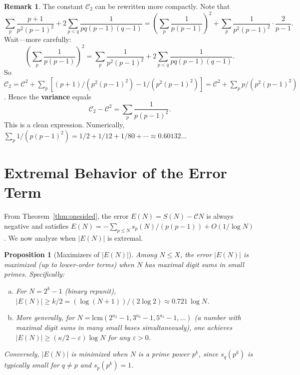 \documentclass[11pt,a4paper]{amsart}
\theoremstyle{plain}
\newtheorem{proposition}[theorem]{Proposition}
\theoremstyle{definition}
\newtheorem{remark}[theorem]{Remark}
\begin{document}
\begin{remark}
The constant $\mathcal{C}_2$ can be rewritten more compactly.  Note that
\[
\sum_p \frac{p+1}{p^2(p-1)^2} + 2\sum_{p < q} \frac{1}{pq(p-1)(q-1)}
= \left(\sum_p \frac{1}{p(p-1)}\right)^2 + \sum_p \frac{1}{p^2(p-1)^2}\cdot\frac{2}{p-1}.
\]
Wait---more carefully:
\[
\left(\sum_p \frac{1}{p(p-1)}\right)^2 = \sum_p \frac{1}{p^2(p-1)^2} + 2\sum_{p<q}\frac{1}{pq(p-1)(q-1)}.
\]
So $\mathcal{C}_2 = \mathcal{C}^2 + \sum_p [({p+1})/({p^2(p-1)^2}) - 1/(p^2(p-1)^2)]
= \mathcal{C}^2 + \sum_p p/(p^2(p-1)^2)$.
Hence the \textbf{variance} equals
\[
\mathcal{C}_2 - \mathcal{C}^2 = \sum_p \frac{1}{p(p-1)^2}.
\]
This is a clean expression.  Numerically, $\sum_p 1/(p(p-1)^2) = 1/2 + 1/12 + 1/80 + \cdots \approx 0.60132\ldots$
\end{remark}

\section{Extremal Behavior of the Error Term}

From Theorem~\ref{thm:onesided}, the error $E(N) = S(N) - \mathcal{C} N$ is always negative and satisfies $E(N) = -\sum_{p \le N} s_p(N)/(p(p-1)) + O(1/\log N)$.  We now analyze when $|E(N)|$ is extremal.

\begin{proposition}[Maximizers of $|E(N)|$]\label{prop:extremal}
Among $N \le X$, the error $|E(N)|$ is maximized (up to lower-order terms) when $N$ has 
maximal digit sums in small primes.  Specifically:
\begin{enumerate}[(a)]
\item For $N = 2^k - 1$ (binary repunit), $|E(N)| \ge k/2 = (\log(N+1))/(2\log 2) \approx 0.721\,\log N$.
\item More generally, for $N = \text{lcm}(2^{a_2}-1, 3^{a_3}-1, 5^{a_5}-1, \ldots)$ (a number with maximal digit sums in many small bases simultaneously), one achieves $|E(N)| \ge (\kappa/2 - \varepsilon)\log N$ for any $\varepsilon > 0$.
\end{enumerate}
Conversely, $|E(N)|$ is minimized when $N$ is a prime power $p^k$, since $s_q(p^k)$ is typically small for $q \neq p$ and $s_p(p^k) = 1$.
\end{proposition}
\end{document}
